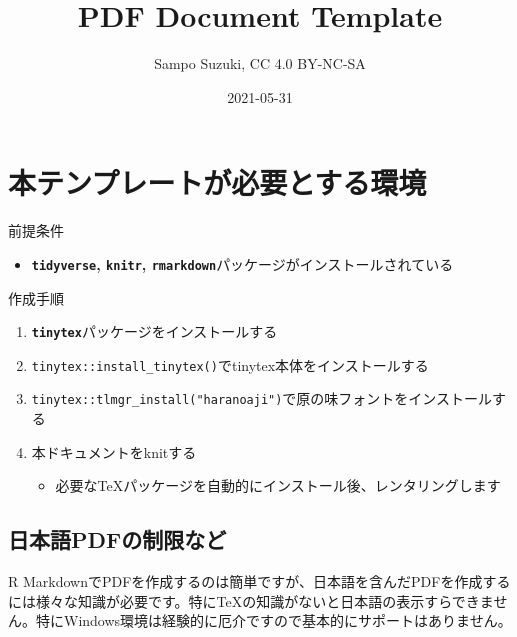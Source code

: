 \documentclass[
  12pt,
  xelatex,ja=standard]{bxjsarticle}
\title{PDF Document Template}
\author{Sampo Suzuki, CC 4.0 BY-NC-SA}
\date{2021-05-31}
\providecommand{\tightlist}{%
  \setlength{\itemsep}{0pt}\setlength{\parskip}{0pt}}
\begin{document}
\maketitle

\hypertarget{ux672cux30c6ux30f3ux30d7ux30ecux30fcux30c8ux304cux5fc5ux8981ux3068ux3059ux308bux74b0ux5883}{%
\section{本テンプレートが必要とする環境}\label{ux672cux30c6ux30f3ux30d7ux30ecux30fcux30c8ux304cux5fc5ux8981ux3068ux3059ux308bux74b0ux5883}}

前提条件

\begin{itemize}
\tightlist
\item
  \textbf{\texttt{tidyverse}, \texttt{knitr},
  \texttt{rmarkdown}}パッケージがインストールされている
\end{itemize}

作成手順

\begin{enumerate}
\def\labelenumi{\arabic{enumi}.}
\tightlist
\item
  \textbf{\texttt{tinytex}}パッケージをインストールする
\item
  \texttt{tinytex::install\_tinytex()}でtinytex本体をインストールする
\item
  \texttt{tinytex::tlmgr\_install("haranoaji")}で原の味フォントをインストールする
\item
  本ドキュメントをknitする

  \begin{itemize}
  \tightlist
  \item
    必要なTeXパッケージを自動的にインストール後、レンタリングします
  \end{itemize}
\end{enumerate}

\hypertarget{ux65e5ux672cux8a9epdfux306eux5236ux9650ux306aux3069}{%
\subsection{日本語PDFの制限など}\label{ux65e5ux672cux8a9epdfux306eux5236ux9650ux306aux3069}}

R
MarkdownでPDFを作成するのは簡単ですが、日本語を含んだPDFを作成するには様々な知識が必要です。特にTeXの知識がないと日本語の表示すらできません。特にWindows環境は経験的に厄介ですので基本的にサポートはありません。
\end{document}

